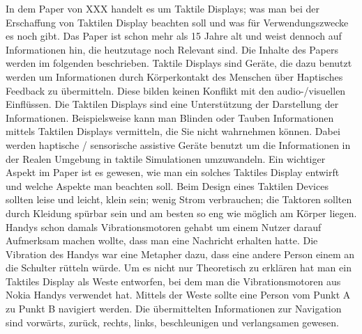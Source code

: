 


In dem Paper von XXX \cite{} handelt es um Taktile Displays; was man bei der Erschaffung von Taktilen Display beachten soll und was f{\"u}r Verwendungszwecke es noch gibt. Das Paper ist schon mehr als 15 Jahre alt und weist dennoch auf Informationen hin, die heutzutage noch Relevant sind. Die Inhalte des Papers werden im folgenden beschrieben.
Taktile Displays sind Ger{\"a}te, die dazu benutzt werden um Informationen durch K{\"o}rperkontakt des Menschen {\"u}ber Haptisches Feedback zu {\"u}bermitteln. Diese bilden keinen Konflikt mit den audio-/visuellen Einfl{\"u}ssen. Die Taktilen Displays sind eine Unterst{\"u}tzung der Darstellung der Informationen. 
Beispielsweise kann man Blinden oder Tauben Informationen mittels Taktilen Displays vermitteln, die Sie nicht wahrnehmen k{\"o}nnen.
Dabei werden haptische / sensorische assistive Ger{\"a}te benutzt um die Informationen in der Realen Umgebung in taktile Simulationen umzuwandeln.
Ein wichtiger Aspekt im Paper ist es gewesen, wie man ein solches Taktiles Display entwirft und welche Aspekte man beachten soll. 
Beim Design eines Taktilen Devices sollten leise und leicht, klein sein; wenig Strom verbrauchen; die Taktoren sollten durch Kleidung sp{\"u}rbar sein und am besten so eng wie m{\"o}glich am K{\"o}rper liegen.  
Handys schon damals Vibrationsmotoren gehabt um einem Nutzer darauf Aufmerksam machen wollte, dass man eine Nachricht erhalten hatte.
Die Vibration des Handys war eine Metapher dazu, dass eine andere Person einem an die Schulter r{\"u}tteln w{\"u}rde. \cite{} 
Um es nicht nur Theoretisch zu erkl{\"a}ren hat man ein Taktiles Display als Weste entworfen, bei dem man die Vibrationsmotoren aus Nokia Handys verwendet hat. Mittels der Weste sollte eine Person vom Punkt A zu Punkt B navigiert werden. 
Die {\"u}bermittelten Informationen zur Navigation sind vorw{\"a}rts, zur{\"u}ck, rechts, links, beschleunigen und verlangsamen gewesen. 